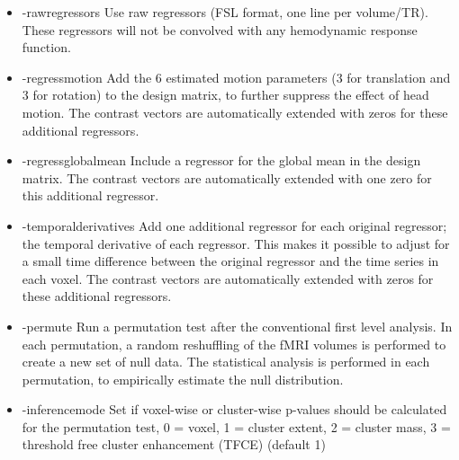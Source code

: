 \begin{itemize}

\item -rawregressors
\newline \newline Use raw regressors (FSL format, one line per volume/TR). These regressors will not be convolved with any hemodynamic response function.

\item -regressmotion 
\newline \newline Add the 6 estimated motion parameters (3 for translation and 3 for rotation) to the design matrix, to further suppress the effect of head motion. The contrast vectors are automatically extended with zeros for these additional regressors. 

\item -regressglobalmean 
\newline \newline Include a regressor for the global mean in the design matrix. The contrast vectors are automatically extended with one zero for this additional regressor. 
 
\item -temporalderivatives 
\newline \newline Add one additional regressor for each original regressor; the temporal derivative of each regressor. This makes it possible to adjust for a small time difference between the original regressor and the time series in each voxel. The contrast vectors are automatically extended with zeros for these additional regressors.

\item -permute
\newline \newline Run a permutation test after the conventional first level analysis. In each permutation, a random reshuffling of the fMRI volumes is performed to create a new set of null data. The statistical analysis is performed in each permutation, to empirically estimate the null distribution. 

\item -inferencemode 
\newline \newline Set if voxel-wise or cluster-wise p-values should be calculated for the permutation test, 0 = voxel, 1 = cluster extent, 2 = cluster mass, 3 = threshold free cluster enhancement (TFCE) (default 1)


\end{itemize}
